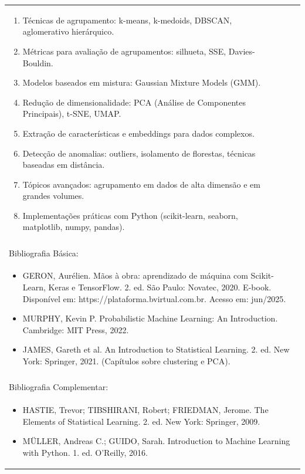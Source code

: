 \documentclass[11pt]{article}
\begin{document}
\begin{center}
\begin{longtable}{|p{4cm}|p{4cm}|p{4cm}|p{4cm}|}
{\begin{enumerate}
\item Técnicas de agrupamento: k-means, k-medoids, DBSCAN, aglomerativo hierárquico.
\item Métricas para avaliação de agrupamentos: silhueta, SSE, Davies-Bouldin.
\item Modelos baseados em mistura: Gaussian Mixture Models (GMM).
\item Redução de dimensionalidade: PCA (Análise de Componentes Principais), t-SNE, UMAP.
\item Extração de características e embeddings para dados complexos.
\item Detecção de anomalias: outliers, isolamento de florestas, técnicas baseadas em distância.
\item Tópicos avançados: agrupamento em dados de alta dimensão e em grandes volumes.
\item Implementações práticas com Python (scikit-learn, seaborn, matplotlib, numpy, pandas).\end{enumerate}}\\
\multicolumn{4}{|p{16cm}|}{}\\
\hline
\multicolumn{4}{|p{16cm}|}{Bibliografia Básica:}\\
\multicolumn{4}{|p{\dimexpr 16cm + 6\tabcolsep\relax}|}{%
\begin{itemize}\item GERON, Aurélien. Mãos à obra: aprendizado de máquina com Scikit-Learn, Keras e TensorFlow. 2. ed. São Paulo: Novatec, 2020. E-book. Disponível em: https://plataforma.bvirtual.com.br. Acesso em: jun/2025.
\item MURPHY, Kevin P. Probabilistic Machine Learning: An Introduction. Cambridge: MIT Press, 2022.
\item JAMES, Gareth et al. An Introduction to Statistical Learning. 2. ed. New York: Springer, 2021. (Capítulos sobre clustering e PCA).\end{itemize}}\\
\multicolumn{4}{|p{16cm}|}{}\\
\hline
\multicolumn{4}{|p{16cm}|}{Bibliografia Complementar:}\\
\multicolumn{4}{|p{\dimexpr 16cm + 6\tabcolsep\relax}|}{%
\begin{itemize}\item HASTIE, Trevor; TIBSHIRANI, Robert; FRIEDMAN, Jerome. The Elements of Statistical Learning. 2. ed. New York: Springer, 2009.
\item MÜLLER, Andreas C.; GUIDO, Sarah. Introduction to Machine Learning with Python. 1. ed. O'Reilly, 2016.

\end{itemize}}
\end{longtable}
\end{center}
\end{document}
